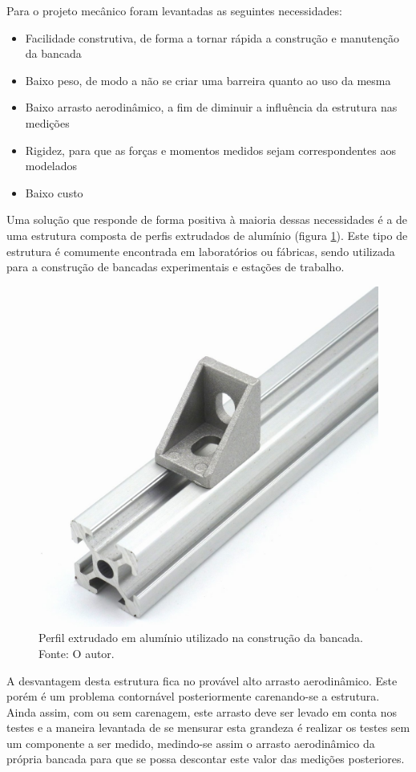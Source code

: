 Para o projeto mecânico foram levantadas as seguintes necessidades:

\begin{itemize}
    \item Facilidade construtiva, de forma a tornar rápida a construção e manutenção da bancada
    \item Baixo peso, de modo a não se criar uma barreira quanto ao uso da mesma
    \item Baixo arrasto aerodinâmico, a fim de diminuir a influência da estrutura nas medições
    \item Rigidez, para que as forças e momentos medidos sejam correspondentes aos modelados
    \item Baixo custo
\end{itemize}

Uma solução que responde de forma positiva à maioria dessas necessidades é a de uma estrutura composta de perfis extrudados de alumínio (figura \ref{fig:perfil_aluminio}). Este tipo de estrutura é comumente encontrada em laboratórios ou fábricas, sendo utilizada para a construção de bancadas experimentais e estações de trabalho.

\begin{figure}[!ht]
    \centering
    \includegraphics[width=.4\linewidth]{figuras/internet/perfil_aluminio.jpg}
    \caption{Perfil extrudado em alumínio utilizado na construção da bancada. Fonte: O autor.}
    \label{fig:perfil_aluminio}
\end{figure}

A desvantagem desta estrutura fica no provável alto arrasto aerodinâmico. Este porém é um problema contornável posteriormente carenando-se a estrutura. Ainda assim, com ou sem carenagem, este arrasto deve ser levado em conta nos testes e a maneira levantada de se mensurar esta grandeza é realizar os testes sem um componente a ser medido, medindo-se assim o arrasto aerodinâmico da própria bancada para que se possa descontar este valor das medições posteriores.

